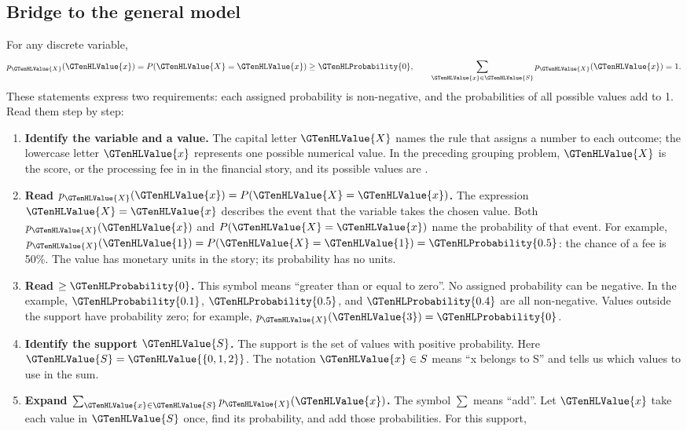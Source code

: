 \subsection{Bridge to the general model}
\label{subsec:t2-c1-bridge-to-the-general-model}
For any discrete variable,
\[p_{\GTenHLValue{X}}(\GTenHLValue{x})=P(\GTenHLValue{X}=\GTenHLValue{x})\geq\GTenHLProbability{0},\qquad \sum_{\GTenHLValue{x}\in\GTenHLValue{S}}p_{\GTenHLValue{X}}(\GTenHLValue{x})=1.\]
These statements express two requirements: each assigned probability is non-negative, and the probabilities of all possible values add to 1. Read them step by step:
\begin{enumerate}
\item \textbf{Identify the variable and a value.} The capital letter $\GTenHLValue{X}$ names the rule that assigns a number to each outcome; the lowercase letter $\GTenHLValue{x}$ represents one possible numerical value. In the preceding grouping problem, $\GTenHLValue{X}$ is the score, or the processing fee in  in the financial story, and its possible values are .
\item \textbf{Read $p_{\GTenHLValue{X}}(\GTenHLValue{x})=P(\GTenHLValue{X}=\GTenHLValue{x})$.} The expression $\GTenHLValue{X}=\GTenHLValue{x}$ describes the event that the variable takes the chosen value. Both $p_{\GTenHLValue{X}}(\GTenHLValue{x})$ and $P(\GTenHLValue{X}=\GTenHLValue{x})$ name the probability of that event. For example, $p_{\GTenHLValue{X}}(\GTenHLValue{1})=P(\GTenHLValue{X}=\GTenHLValue{1})=\GTenHLProbability{0.5}$: the chance of a  fee is 50\%. The value has monetary units in the story; its probability has no units.
\item \textbf{Read $\geq\GTenHLProbability{0}$.} This symbol means ``greater than or equal to zero''. No assigned probability can be negative. In the example, $\GTenHLProbability{0.1}$, $\GTenHLProbability{0.5}$, and $\GTenHLProbability{0.4}$ are all non-negative. Values outside the support have probability zero; for example, $p_{\GTenHLValue{X}}(\GTenHLValue{3})=\GTenHLProbability{0}$.
\item \textbf{Identify the support $\GTenHLValue{S}$.} The support is the set of values with positive probability. Here $\GTenHLValue{S}=\GTenHLValue{\{0,1,2\}}$. The notation $\GTenHLValue{x}\in S$ means ``x belongs to S'' and tells us which values to use in the sum.
\item \textbf{Expand $\sum_{\GTenHLValue{x}\in\GTenHLValue{S}}p_{\GTenHLValue{X}}(\GTenHLValue{x})$.} The symbol $\sum$ means ``add''. Let $\GTenHLValue{x}$ take each value in $\GTenHLValue{S}$ once, find its probability, and add those probabilities. For this support,

\end{enumerate}
